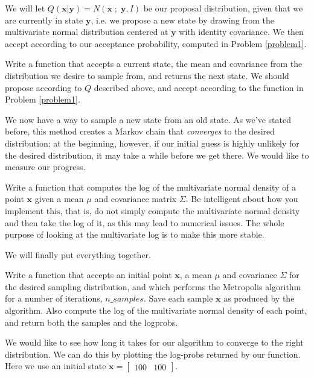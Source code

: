 We will let $Q(\mathbf{x} | \mathbf{y}) = N(\mathbf{x} \; ; \; \mathbf{y}, I)$ be our proposal distribution, given that we are currently in state $\mathbf{y}$, i.e. we propose a new state by drawing from the multivariate normal distribution centered at $\mathbf{y}$ with identity covariance. We then accept according to our acceptance probability, computed in Problem \ref{problem1}.

\begin{problem}
Write a function that accepts a current state, the mean and covariance from the distribution we desire to sample from, and returns the next state. We should propose according to $Q$ described above, and accept according to the function in Problem \ref{problem1}.
\end{problem}

We now have a way to sample a new state from an old state. As we've stated before, this method creates a Markov chain that \emph{converges} to the desired distribution; at the beginning, however, if our initial guess is highly unlikely for the desired distribution, it may take a while before we get there. We would like to measure our progress.

\begin{problem}
Write a function that computes the log of the multivariate normal density of a point $\mathbf{x}$ given a mean $\mu$ and covariance matrix $\Sigma$. Be intelligent about how you implement this, that is, do not simply compute the multivariate normal density and then take the log of it, as this may lead to numerical issues. The whole purpose of looking at the multivariate log is to make this more stable.
\end{problem}

We will finally put everything together.

\begin{problem}
Write a function that accepts an initial point $\mathbf{x}$, a mean $\mu$ and covariance $\Sigma$ for the desired sampling distribution, and which performs the Metropolis algorithm for a number of iterations, $n\_samples$. Save each sample $\mathbf{x}$ as produced by the algorithm. Also compute the log of the multivariate normal density of each point, and return both the samples and the logprobs.
\end{problem}

We would like to see how long it takes for our algorithm to converge to the right distribution. We can do this by plotting the log-probs returned by our function. Here we use an initial state $\mathbf{x} = \left[\begin{array}{cc} 100 & 100 \end{array}\right]$.

